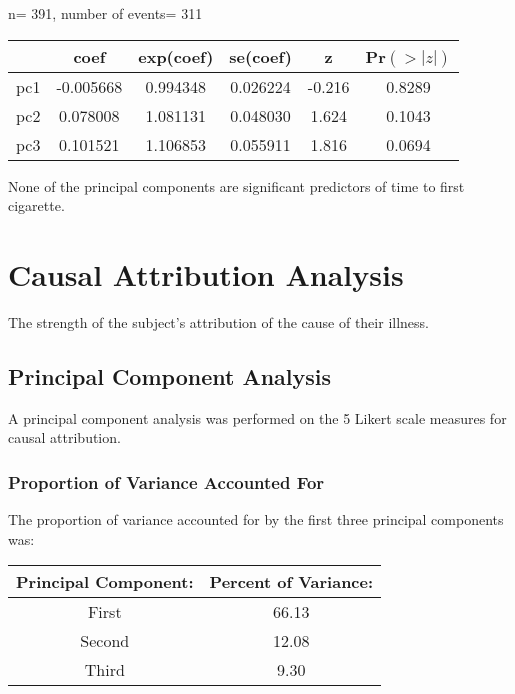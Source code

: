 \documentclass[12pt]{article}
\begin{document}
  n= 391, number of events= 311
\par\vspace{0.3 cm}
\begin{tabular}{cccccc}
    &     coef & exp(coef) &  se(coef) & z   & Pr$(>|z|)$\\
\hline  
pc1& -0.005668&  0.994348&  0.026224& -0.216&   0.8289\\
pc2&  0.078008&  1.081131&  0.048030&  1.624&   0.1043\\  
pc3&  0.101521&  1.106853&  0.055911&  1.816&   0.0694
\end{tabular}
\par\vspace{0.3 cm}
None of the principal components are significant predictors of time to first cigarette.
\par\vspace{0.3 cm}

\section*{Causal Attribution Analysis}
\par\vspace{0.3 cm}
The strength of the subject's attribution of the cause of their illness.  
\par\vspace{0.3 cm}
\subsection*{Principal Component Analysis}
A principal component analysis was performed on the 5 Likert scale measures for causal attribution.
\par\vspace{0.3 cm}
\subsubsection*{Proportion of Variance Accounted For}
The proportion of variance accounted for by the first three principal components was:
\par\vspace{0.3 cm}
\begin{tabular}{cc} Principal Component: & Percent of Variance:\\
\hline
First  & 66.13\\
Second & 12.08\\
Third  &  9.30
\end{tabular}
\par\vspace{0.3 cm}
\end{document}
